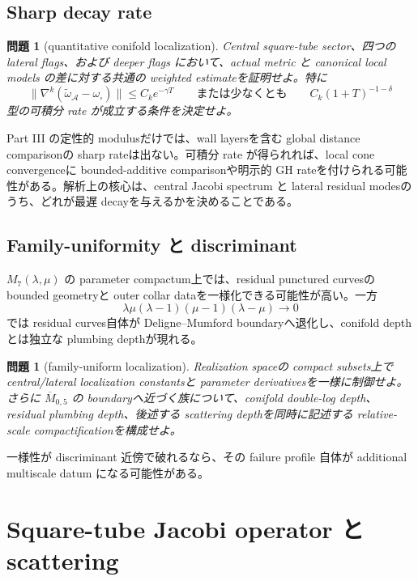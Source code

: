 \documentclass[11pt,a4paper]{ltjsarticle}
\newcommand{\cA}{\mathcal A}\newcommand{\cH}{\mathcal H}\newcommand{\cL}{\mathcal L}
\newcommand{\ov}{\overline}\newcommand{\eps}{\varepsilon}\newcommand{\Spec}{\operatorname{Spec}}
\theoremstyle{plain}
\newtheorem{problem}[conjecture]{問題}
\theoremstyle{definition}
\theoremstyle{remark}
\begin{document}
\subsection{Sharp decay rate}

\begin{problem}[quantitative conifold localization]\label{prob:quantitative-localization-v22}
Central square-tube sector、四つの lateral flags、および deeper flags において、actual metric と canonical local models の差に対する共通の weighted estimateを証明せよ。特に
\[
 \|\nabla^k(\widetilde\omega_\cA-\omega_\square)\|
 \le C_k e^{-\gamma T}
 \qquad\text{または少なくとも}\qquad
 C_k(1+T)^{-1-\delta}
\]
型の可積分 rate が成立する条件を決定せよ。
\end{problem}

Part III の定性的 modulusだけでは、wall layersを含む global distance comparisonの sharp rateは出ない。可積分 rate が得られれば、local cone convergenceに bounded-additive comparisonや明示的 GH rateを付けられる可能性がある。解析上の核心は、central Jacobi spectrum と lateral residual modesのうち、どれが最遅 decayを与えるかを決めることである。

\subsection{Family-uniformity と discriminant}

$M_7(\lambda,\mu)$ の parameter compactum上では、residual punctured curvesの bounded geometryと outer collar dataを一様化できる可能性が高い。一方
\[
 \lambda\mu(\lambda-1)(\mu-1)(\lambda-\mu)\longrightarrow0
\]
では residual curves自体が Deligne--Mumford boundaryへ退化し、conifold depthとは独立な plumbing depthが現れる。

\begin{problem}[family-uniform localization]\label{prob:family-uniform-v22}
Realization spaceの compact subsets上で central/lateral localization constantsと parameter derivativesを一様に制御せよ。さらに $\ov M_{0,5}$ の boundaryへ近づく族について、conifold double-log depth、residual plumbing depth、後述する scattering depthを同時に記述する relative-scale compactificationを構成せよ。
\end{problem}

一様性が discriminant 近傍で破れるなら、その failure profile 自体が additional multiscale datum になる可能性がある。

\section{Square-tube Jacobi operator と scattering}
\end{document}
